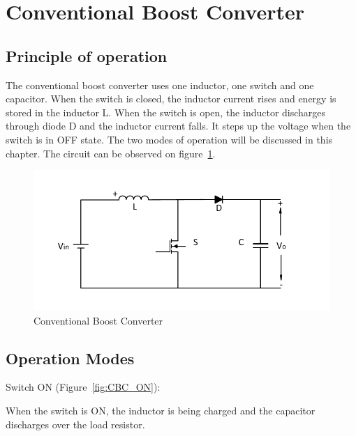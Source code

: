 \section{Conventional Boost Converter}\label{ch:CBC}

\subsection{Principle of operation}\label{sec:CBC_POC}

The conventional boost converter uses one inductor,
one switch and one capacitor. When the switch is closed, the inductor current rises and energy is stored in the inductor L. When the switch is open, the inductor discharges through diode D and the inductor current falls. It steps up the voltage when
the switch is in OFF state. The two modes of operation will be discussed in this chapter. The circuit can be observed on figure~\ref{fig:CBC}.


\begin{figure}[H]
   \centering
   \includegraphics[width=\textwidth]{figures/aConventionalBoost/ConventionalBoostConverter.pdf}
    \caption{Conventional Boost Converter}
	\label{fig:CBC}
\end{figure}

\subsection{Operation Modes}\label{sec:CBC_OP}

Switch ON (Figure~\ref{fig:CBC_ON}):

When the switch is ON,
the inductor is being charged and the capacitor discharges over the load resistor.

